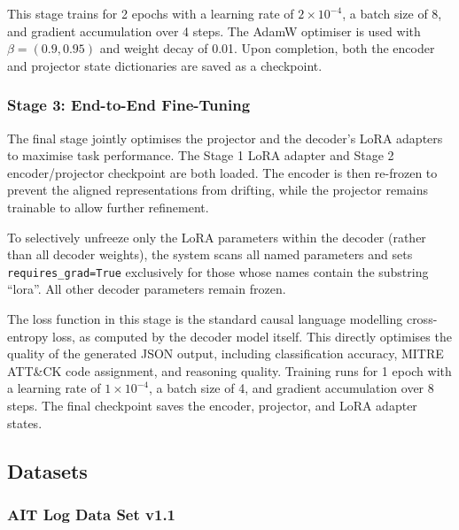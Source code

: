 This stage trains for 2 epochs with a learning rate of $2 \times 10^{-4}$, a batch size of 8, and gradient accumulation over 4 steps. The AdamW optimiser is used with $\beta = (0.9, 0.95)$ and weight decay of 0.01. Upon completion, both the encoder and projector state dictionaries are saved as a checkpoint.

\subsubsection{Stage 3: End-to-End Fine-Tuning}

The final stage jointly optimises the projector and the decoder's LoRA adapters to maximise task performance. The Stage 1 LoRA adapter and Stage 2 encoder/projector checkpoint are both loaded. The encoder is then re-frozen to prevent the aligned representations from drifting, while the projector remains trainable to allow further refinement.

To selectively unfreeze only the LoRA parameters within the decoder (rather than all decoder weights), the system scans all named parameters and sets \texttt{requires\_grad=True} exclusively for those whose names contain the substring ``lora''. All other decoder parameters remain frozen.

The loss function in this stage is the standard causal language modelling cross-entropy loss, as computed by the decoder model itself. This directly optimises the quality of the generated JSON output, including classification accuracy, MITRE ATT\&CK code assignment, and reasoning quality. Training runs for 1 epoch with a learning rate of $1 \times 10^{-4}$, a batch size of 4, and gradient accumulation over 8 steps. The final checkpoint saves the encoder, projector, and LoRA adapter states.

\subsection{Datasets}\label{sec:datasets}


\subsubsection{AIT Log Data Set v1.1}


